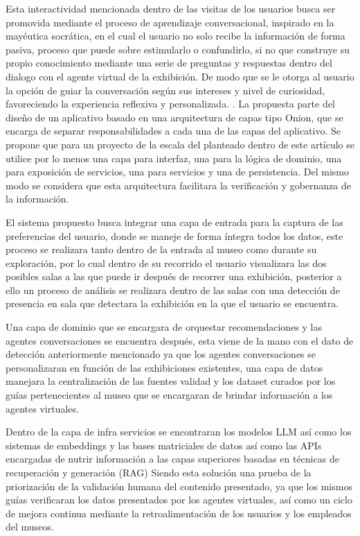 \documentclass[pdflatex,sn-mathphys-num]{sn-jnl}%
\theoremstyle{thmstyleone}%
\theoremstyle{thmstyletwo}%
\theoremstyle{thmstylethree}%
\begin{document}
Esta interactividad mencionada dentro de las visitas de los usuarios busca ser promovida mediante el proceso de aprendizaje conversacional, inspirado en la mayéutica socrática, en el cual el usuario no solo recibe la información de forma pasiva, proceso que puede sobre estimularlo o confundirlo, si no que construye su propio conocimiento mediante una serie de preguntas y respuestas dentro del dialogo con el agente virtual de la exhibición. De modo que se le otorga al usuario la opción de guiar la conversación según sus intereses y nivel de curiosidad, favoreciendo la experiencia reflexiva y personalizada.
. 
La propuesta parte del diseño de un aplicativo basado en una arquitectura de capas tipo Onion, que se encarga de separar responsabilidades a cada una de las capas del aplicativo. Se propone que para un proyecto de la escala del planteado dentro de este artículo se utilice por lo menos una capa para interfaz, una para la lógica de dominio, una para exposición de servicios, una para servicios y una de persistencia. Del mismo modo se considera que esta arquitectura facilitara la verificación y gobernanza de la información. 

El sistema propuesto busca integrar una capa de entrada para la captura de las preferencias del usuario, donde se maneje de forma íntegra todos los datos, este proceso se realizara tanto dentro de la entrada al museo como durante su exploración, por lo cual dentro de su recorrido el usuario visualizara las dos posibles salas a las que puede ir después de recorrer una exhibición, posterior a ello un proceso de análisis se realizara dentro de las salas con una detección de presencia en sala que detectara la exhibición en la que el usuario se encuentra.

Una capa de dominio que se encargara de orquestar recomendaciones y las agentes conversaciones se encuentra después, esta viene de la mano con el dato de detección anteriormente mencionado ya que los agentes conversaciones se personalizaran en función de las exhibiciones existentes, una capa de datos manejara la centralización de las fuentes validad y los dataset curados por los guías pertenecientes al museo que se encargaran de brindar información a los agentes virtuales.

Dentro de la capa de infra servicios se encontraran los modelos LLM así como los sistemas de embeddings y las bases matriciales de datos así como las APIs encargadas de nutrir información a las capas superiores basadas en técnicas de recuperación y generación (RAG) Siendo esta solución una prueba de la priorización de la validación humana del contenido presentado, ya que los mismos guías verificaran los datos presentados por los agentes virtuales, así como un ciclo de mejora continua mediante la retroalimentación de los usuarios y los empleados del museos.
\end{document}
